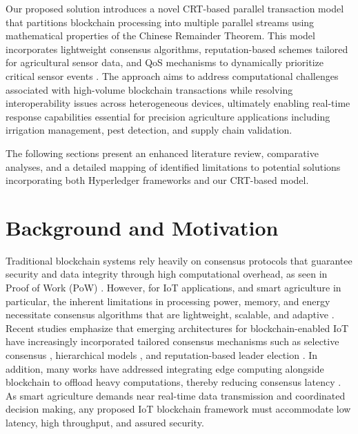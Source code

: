 \documentclass[12pt,onecolumn]{IEEEtran} %
\begin{document}
Our proposed solution introduces a novel CRT-based parallel transaction model that partitions blockchain processing into multiple parallel streams using mathematical properties of the Chinese Remainder Theorem. This model incorporates lightweight consensus algorithms, reputation-based schemes tailored for agricultural sensor data, and QoS mechanisms to dynamically prioritize critical sensor events \cite{thiruvenkatasamy2025anonlinetool, huang2025digitaltraceabilityin}. The approach aims to address computational challenges associated with high-volume blockchain transactions while resolving interoperability issues across heterogeneous devices, ultimately enabling real-time response capabilities essential for precision agriculture applications including irrigation management, pest detection, and supply chain validation.

The following sections present an enhanced literature review, comparative analyses, and a detailed mapping of identified limitations to potential solutions incorporating both Hyperledger frameworks and our CRT-based model.


\section{Background and Motivation}\label{sec:background}
Traditional blockchain systems rely heavily on consensus protocols that guarantee security and data integrity through high computational overhead, as seen in Proof of Work (PoW) \cite{ali2022blockchainenabledarchitecture}. However, for IoT applications, and smart agriculture in particular, the inherent limitations in processing power, memory, and energy necessitate consensus algorithms that are lightweight, scalable, and adaptive \cite{bryant2022keychallengesin, khan2022asurveyand}. Recent studies emphasize that emerging architectures for blockchain-enabled IoT have increasingly incorporated tailored consensus mechanisms such as selective consensus \cite{ali2022blockchainenabledarchitecture}, hierarchical models \cite{guo2022ahierarchicaland}, and reputation-based leader election \cite{morais2023surveyonintegration}. In addition, many works have addressed integrating edge computing alongside blockchain to offload heavy computations, thereby reducing consensus latency \cite{khan2022asurveyand, haque2024ascalableblockchain}. As smart agriculture demands near real-time data transmission and coordinated decision making, any proposed IoT blockchain framework must accommodate low latency, high throughput, and assured security.
\end{document}
